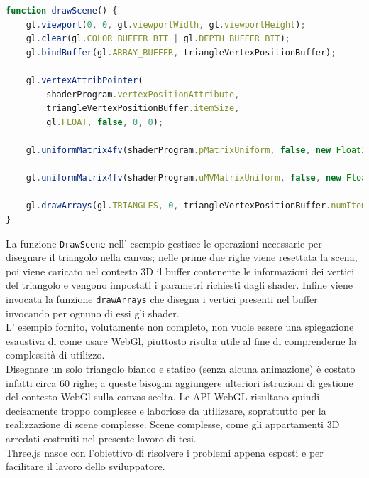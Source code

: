 \begin{lstlisting}[language=javascript]
function drawScene() {
	gl.viewport(0, 0, gl.viewportWidth, gl.viewportHeight);
	gl.clear(gl.COLOR_BUFFER_BIT | gl.DEPTH_BUFFER_BIT);
	gl.bindBuffer(gl.ARRAY_BUFFER, triangleVertexPositionBuffer);

	gl.vertexAttribPointer(
		shaderProgram.vertexPositionAttribute,
		triangleVertexPositionBuffer.itemSize,
		gl.FLOAT, false, 0, 0);

	gl.uniformMatrix4fv(shaderProgram.pMatrixUniform, false, new Float32Array([1,0,0,0,....]));

	gl.uniformMatrix4fv(shaderProgram.uMVMatrixUniform, false, new Float32Array([1,0,0,0,..]));

	gl.drawArrays(gl.TRIANGLES, 0, triangleVertexPositionBuffer.numItems);
}
\end{lstlisting}
La funzione \texttt{DrawScene} nell’ esempio gestisce le operazioni necessarie per disegnare il triangolo nella canvas; nelle prime due righe viene resettata la scena, poi viene caricato nel contesto 3D il buffer contenente le informazioni dei vertici del triangolo e vengono impostati i parametri richiesti dagli shader.
Infine viene invocata la funzione \texttt{drawArrays} che disegna i vertici presenti nel buffer invocando per ognuno di essi gli shader.
\\
L’ esempio fornito, volutamente non completo, non vuole essere una spiegazione esaustiva di come usare WebGl, piuttosto risulta utile al fine di comprenderne la complessità di utilizzo.
\\
Disegnare un solo triangolo bianco e statico (senza alcuna animazione) è costato infatti circa 60 righe; a queste bisogna aggiungere ulteriori istruzioni di gestione del contesto WebGl sulla canvas scelta.
Le API WebGL risultano quindi decisamente troppo complesse e laboriose da utilizzare, soprattutto per la realizzazione di scene complesse. Scene complesse, come gli appartamenti 3D arredati costruiti nel presente lavoro di tesi.
\\
Three.js nasce con l’obiettivo di risolvere i problemi appena esposti e per facilitare il lavoro dello sviluppatore.

